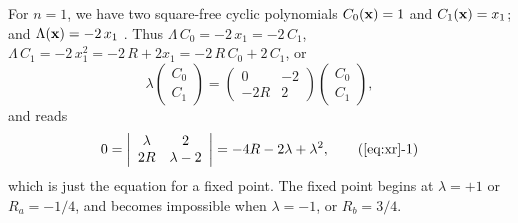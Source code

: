 \documentclass[preprint]{revtex4-1}
\begin{document}
For $n = 1$, we have two square-free cyclic polynomials
  $C_0(\mathbf{x}) = 1$ and $C_1(\mathbf{x}) = x_1$;
  and $\Lambda(\mathbf{x}) = -2 \, x_1$
.
Thus $\Lambda \, C_0 = -2 \, x_1 = -2 \, C_1$,
$\Lambda \, C_1 = -2 \, x_1^2 = -2 \, R + 2 x_1 = -2 \, R \, C_0 + 2 \, C_1$,
or
\[
  \lambda
  \left( \begin{array}{c}
  C_0 \\
  C_1
  \end{array} \right)
  =
  \left( \begin{array}{cc}
  0     & -2 \\
  -2R   &  2
  \end{array}\right)
  \left( \begin{array}{c}
  C_0 \\
  C_1
  \end{array} \right),
\]
and  reads
\begin{equation}
0=  \left| \begin{array}{cc}
  \lambda     & 2          \\
  2 R         & \lambda - 2
  \end{array} \right| = -4R - 2\lambda + \lambda^2,
  \tag{\ref{eq:xr}-1}
\label{eq:xr1}
\end{equation}
which is just the equation for a fixed point.
The fixed point begins at $\lambda = +1$ or $R_a = -1/4$,
  and becomes impossible when $\lambda = -1$, or $R_b = 3/4$.
\end{document}
